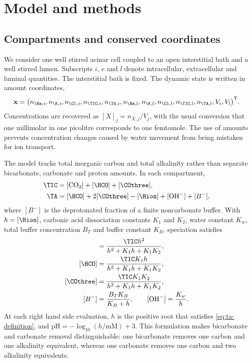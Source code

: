 \section{Model and methods}
\label{sec:model}

\subsection{Compartments and conserved coordinates}

We consider one well stirred acinar cell coupled to an open interstitial bath and a well stirred lumen. Subscripts $i$, $e$ and $l$ denote intracellular, extracellular and luminal quantities. The interstitial bath is fixed. The dynamic state is written in amount coordinates,
\begin{equation}
\label{eq:state-vector}
\mathbf{x}=\bigl(
 n_{\Na,i},n_{\K,i},n_{\Cl,i},n_{\TIC,i},n_{\TA,i},
 n_{\Na,l},n_{\K,l},n_{\Cl,l},n_{\TIC,l},n_{\TA,l},V_i,V_l
\bigr)^{\mathsf T}.
\end{equation}
Concentrations are recovered as $[X]_j=n_{X,j}/V_j$, with the usual conversion that one millimolar in one picolitre corresponds to one femtomole. The use of amounts prevents concentration changes caused by water movement from being mistaken for ion transport.

The model tracks total inorganic carbon and total alkalinity rather than separate bicarbonate, carbonate and proton amounts. In each compartment,
\begin{align}
\TIC &= [\mathrm{CO}_2]+[\HCO]+[\COthree],
\label{eq:tic-definition}\\
\TA &= [\HCO]+2[\COthree]-[\Hion]+[\mathrm{OH}^{-}]+[B^{-}],
\label{eq:ta-definition}
\end{align}
where $[B^-]$ is the deprotonated fraction of a finite noncarbonate buffer. With $h=[\Hion]$, carbonic acid dissociation constants $K_1$ and $K_2$, water constant $K_w$, total buffer concentration $B_T$ and buffer constant $K_B$, speciation satisfies
\begin{align*}
[\mathrm{CO}_2]&=\frac{\TIC h^2}{h^2+K_1h+K_1K_2},\\
[\HCO]&=\frac{\TIC K_1h}{h^2+K_1h+K_1K_2},\\
[\COthree]&=\frac{\TIC K_1K_2}{h^2+K_1h+K_1K_2},\\
[B^-]&=\frac{B_TK_B}{K_B+h},\qquad [\mathrm{OH}^{-}]=\frac{K_w}{h}.
\end{align*}
At each right hand side evaluation, $h$ is the positive root that satisfies \cref{eq:ta-definition}, and $\mathrm{pH}=-\log_{10}(h/\mathrm{mM})+3$. This formulation makes bicarbonate and carbonate removal distinguishable: one bicarbonate removes one carbon and one alkalinity equivalent, whereas one carbonate removes one carbon and two alkalinity equivalents.

